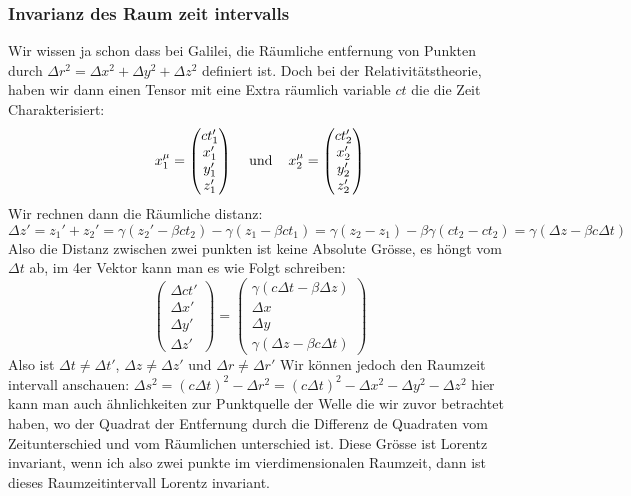 \documentclass{article}
\newcommand{\mspc}{\hspace{0.4cm}}
\begin{document}
\subsubsection{Invarianz des Raum zeit intervalls} 
Wir wissen ja schon dass bei Galilei, die Räumliche entfernung von Punkten durch $\Delta r^2=\Delta x^2+\Delta y^2+\Delta z^2$ definiert ist. Doch bei der Relativitätstheorie, haben wir dann einen Tensor mit eine Extra räumlich variable $ct$ die die Zeit Charakterisiert:
\[x_1^\mu=\begin{pmatrix}ct_1'\\x_1'\\y_1'\\z_1'\end{pmatrix}\mspc\text{und}\mspc x_2^\mu=\begin{pmatrix}ct_2'\\x_2'\\y_2'\\z_2'\end{pmatrix}\]
Wir rechnen dann die Räumliche distanz:
\[\Delta z' = z_1'+z_2'=\gamma(z_2'-\beta c t_2)-\gamma(z_1-\beta ct_1)=\gamma(z_2-z_1)-\beta\gamma(ct_2-ct_2)=\gamma(\Delta z-\beta c\Delta t)\]
Also die Distanz zwischen zwei punkten ist keine Absolute Grösse, es höngt vom $\Delta t$ ab, im 4er Vektor kann man es wie Folgt schreiben:
\[\begin{pmatrix}\Delta ct'\\\Delta x'\\\Delta y'\\\Delta z'\end{pmatrix}=\begin{pmatrix}\gamma(c\Delta t-\beta\Delta z)\\\Delta x\\\Delta y\\\gamma(\Delta z-\beta c\Delta t)\end{pmatrix}\]
Also ist $\Delta t\neq\Delta t'$, $\Delta z\neq \Delta z'$ und $\Delta r\neq\Delta r'$
Wir können jedoch den Raumzeit intervall anschauen: $\Delta s^2=(c\Delta t)^2-\Delta r^2=(c\Delta t)^2-\Delta x^2-\Delta y^2-\Delta z^2$ hier kann man auch ähnlichkeiten zur Punktquelle der Welle die wir zuvor betrachtet haben, wo der Quadrat der Entfernung durch die Differenz de Quadraten vom Zeitunterschied und vom Räumlichen unterschied ist.
Diese Grösse ist Lorentz invariant, wenn ich also zwei punkte im vierdimensionalen Raumzeit, dann ist dieses Raumzeitintervall Lorentz invariant. 
\end{document}
